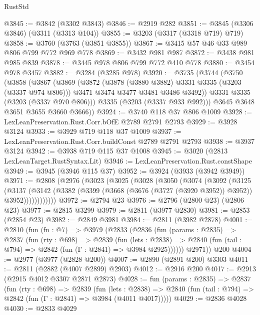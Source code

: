 \begin{lexlean}{RustStd}
\begin{coremodule}
{\begin{coremodule}
{{{{{{{{{{{{{{{@3845 := @3842 (@3302 @3843)
@3846 := @2919 @282
@3851 := @3845 (@3306 @3846) (@3311 (@3313 @104))
@3855 := @3203 (@3317 (@3318 @719) @719)
@3858 := @3760 (@3763 (@3851 @3855))
@3867 := @3415 @57 @46 @33 @989 @806 @799 @772 @969 @778
@3869 := @3432 @981 @987
@3872 := @3438 @981 @985 @839
@3878 := @3445 @978 @806 @799 @772 @410 @778
@3880 := @3454 @978 @3457
@3882 := @3284 (@3285 @978)
@3920 := @3735
    (@3744
      (@3750
        (@3858
          (@3867
            (@3869
              (@3872
                (@3878 (@3880 @3882) @3331 @3335 (@3203 (@3337 @974 @806)))
                @3471
                @3474
                @3477
                @3481
                @3486
                @3492))
            @3331
            @3335
            (@3203 (@3337 @970 @806)))
          @3335
          (@3203 (@3337 @933 @992)))
        @3645
        @3648
        @3651
        @3655
        @3660
        @3666))
@3924 := @3740 @118 @37 @806 @1009
@3928 := LexLeanPreservation.Rust.Corr.bOfE @2789 @2791 @2793
@3929 := @3928 @3124
@3933 := @3929 @719 @118 @37 @1009
@3937 := LexLeanPreservation.Rust.Corr.buildConst @2789 @2791 @2793
@3938 := @3937 @3124
@3942 := @3938 @719 @115 @37 @1008
@3945 := @3020 (@2813 LexLeanTarget.RustSyntax.Lit)
@3946 := LexLeanPreservation.Rust.constShape
@3949 := @3945 (@3946 @115 @37)
@3952 := @3924 (@3933 (@3942 @3949))
@3971 := @2808
    (@2976
      (@3023
        (@3025
          (@3028
            (@3050
              (@3074
                (@3092
                  (@3125
                    (@3137
                      (@3142
                        (@3382 (@3399 (@3668 (@3676 (@3727 (@3920 @3952)) @3952)) @3952))))))))))))
@3972 := @2794 @23
@3976 := @2796 (@2800 @23) (@2806 @23)
@3977 := @2815 @3299
@3979 := @2811 (@3977 @2830)
@3981 := @2853 (@2854 @23)
@3982 := @2849 @3981
@3984 := @2811 (@3982 @2878)
@4001 := @2810
    (fun (fn : @7) =>
    @3979
      (@2833
        (@2836
          (fun (params : @2835) =>
          @2837
            (fun (rty : @698) =>
            @2839
              (fun (lets : @2838) =>
              @2840 (fun (tail : @794) => @2842 (fun (Γ : @2841) => @3984 @2925))))))
        @2971))
    @200
@4004 := @2977 (@3977 (@2828 @200))
@4007 := @2890 (@2891 @200) @3303
@4011 := @2811 (@2882 (@4007 @2899) @2903)
@4012 := @2916 @200
@4017 := @2913 (@2915 @4012 @3307 @2871 @2873)
@4028 := fun (params : @2835) =>
  @2837
    (fun (rty : @698) =>
    @2839
      (fun (lets : @2838) =>
      @2840 (fun (tail : @794) => @2842 (fun (Γ : @2841) => @3984 (@4011 @4017)))))
@4029 := @2836 @4028
@4030 := @2833 @4029
}}}}}}}}}}}}}}}
\end{coremodule}}
\end{coremodule}
\end{lexlean}
